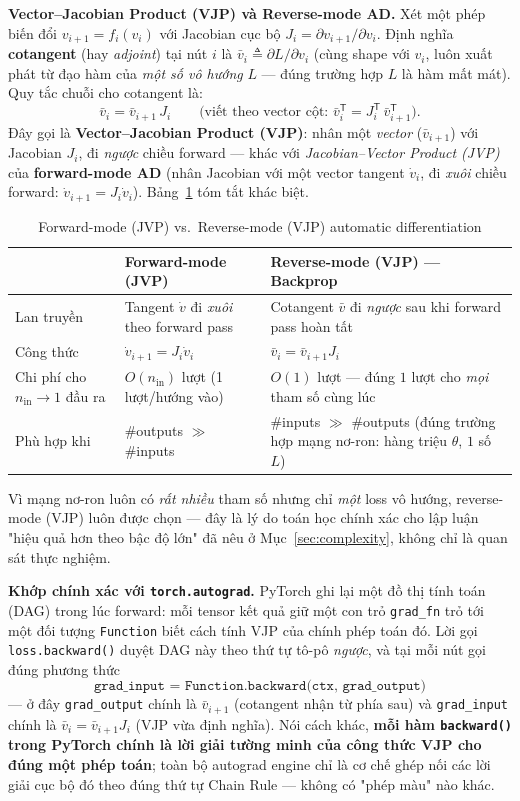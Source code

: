 \documentclass[12pt,a4paper]{article}
\newcommand{\en}[1]{\textit{#1}}
\newcommand{\T}{^{\mathsf{T}}}
\begin{document}
\textbf{Vector--Jacobian Product (VJP) và Reverse-mode AD.} Xét một phép
biến đổi $v_{i+1}=f_i(v_i)$ với Jacobian cục bộ $J_i=\partial v_{i+1}/\partial v_i$.
Định nghĩa \textbf{cotangent} (hay \emph{adjoint}) tại nút $i$ là
$\bar v_i \triangleq \partial L/\partial v_i$ (cùng shape với $v_i$, luôn
xuất phát từ đạo hàm của \emph{một số vô hướng} $L$ --- đúng trường hợp
$L$ là hàm mất mát). Quy tắc chuỗi cho cotangent là:
$$\bar v_i = \bar v_{i+1}\,J_i \qquad \Big(\text{viết theo vector cột: } \bar v_i\T = J_i\T\,\bar v_{i+1}\T\Big).$$
Đây gọi là \textbf{Vector--Jacobian Product (VJP)}: nhân một \emph{vector}
($\bar v_{i+1}$) với Jacobian $J_i$, đi \emph{ngược} chiều forward --- khác
với \en{Jacobian--Vector Product (JVP)} của \textbf{forward-mode AD} (nhân
Jacobian với một vector tangent $\dot v_i$, đi \emph{xuôi} chiều forward:
$\dot v_{i+1}=J_i\dot v_i$). Bảng~\ref{tab:vjp_jvp} tóm tắt khác biệt.

\begin{table}[htbp]
\centering
\small
\begin{tabular}{@{}p{2.6cm}p{5.5cm}p{6.1cm}@{}}
\toprule
 & \textbf{Forward-mode (JVP)} & \textbf{Reverse-mode (VJP) --- Backprop} \\
\midrule
Lan truyền & Tangent $\dot v$ đi \emph{xuôi} theo forward pass & Cotangent $\bar v$ đi \emph{ngược} sau khi forward pass hoàn tất \\
Công thức & $\dot v_{i+1} = J_i\dot v_i$ & $\bar v_i = \bar v_{i+1}J_i$ \\
Chi phí cho $n_{\text{in}}\to1$ đầu ra & $O(n_{\text{in}})$ lượt (1 lượt/hướng vào) & $O(1)$ lượt --- đúng $1$ lượt cho \emph{mọi} tham số cùng lúc \\
Phù hợp khi & \#outputs $\gg$ \#inputs & \#inputs $\gg$ \#outputs (đúng trường hợp mạng nơ-ron: hàng triệu $\theta$, $1$ số $L$) \\
\bottomrule
\end{tabular}
\caption{Forward-mode (JVP) vs.\ Reverse-mode (VJP) automatic differentiation}
\label{tab:vjp_jvp}
\end{table}

Vì mạng nơ-ron luôn có \emph{rất nhiều} tham số nhưng chỉ \emph{một} loss
vô hướng, reverse-mode (VJP) luôn được chọn --- đây là lý do toán học
chính xác cho lập luận "hiệu quả hơn theo bậc độ lớn" đã nêu ở
Mục~\ref{sec:complexity}, không chỉ là quan sát thực nghiệm.

\textbf{Khớp chính xác với \texttt{torch.autograd}.} PyTorch ghi lại một
đồ thị tính toán (DAG) trong lúc forward: mỗi tensor kết quả giữ một con
trỏ \texttt{grad\_fn} trỏ tới một đối tượng \texttt{Function} biết cách
tính VJP của chính phép toán đó. Lời gọi \texttt{loss.backward()} duyệt
DAG này theo thứ tự tô-pô \emph{ngược}, và tại mỗi nút gọi đúng phương
thức
$$\texttt{grad\_input = Function.backward(ctx, grad\_output)}$$
--- ở đây \texttt{grad\_output} chính là $\bar v_{i+1}$ (cotangent nhận từ
phía sau) và \texttt{grad\_input} chính là $\bar v_i=\bar v_{i+1}J_i$ (VJP
vừa định nghĩa). Nói cách khác, \textbf{mỗi hàm \texttt{backward()} trong
PyTorch chính là lời giải tường minh của công thức VJP cho đúng một phép
toán}; toàn bộ autograd engine chỉ là cơ chế ghép nối các lời giải cục bộ
đó theo đúng thứ tự Chain Rule --- không có "phép màu" nào khác.
\end{document}
